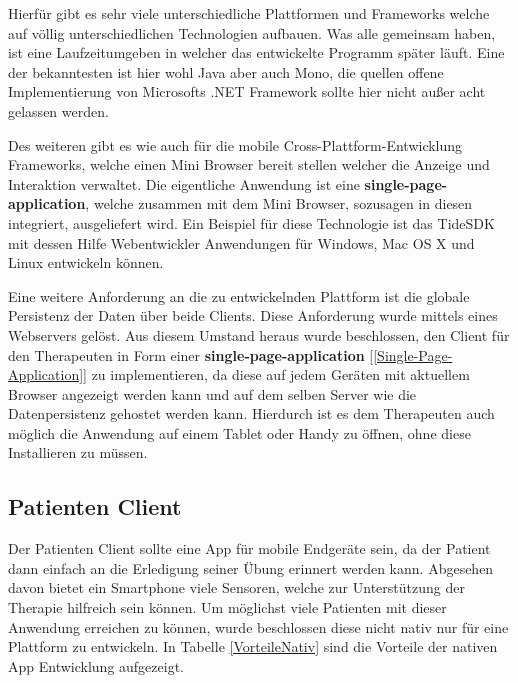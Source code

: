 Hierfür gibt es sehr viele unterschiedliche Plattformen und Frameworks welche auf völlig unterschiedlichen Technologien aufbauen. Was alle gemeinsam haben, ist eine Laufzeitumgeben in welcher das entwickelte Programm später läuft. Eine der bekanntesten ist hier wohl Java aber auch Mono, die quellen offene Implementierung von Microsofts .NET Framework sollte hier nicht außer acht gelassen werden. 

Des weiteren gibt es wie auch für die mobile Cross-Plattform-Entwicklung Frameworks, welche einen Mini Browser bereit stellen welcher die Anzeige und Interaktion verwaltet. Die eigentliche Anwendung ist eine \textbf{single-page-application}, welche zusammen mit dem Mini Browser, sozusagen in diesen integriert, ausgeliefert wird. Ein Beispiel für diese Technologie ist das TideSDK mit dessen Hilfe Webentwickler Anwendungen für Windows, Mac OS X und Linux entwickeln können.

Eine weitere Anforderung an die zu entwickelnden Plattform ist die globale Persistenz der Daten über beide Clients. Diese Anforderung wurde mittels eines Webservers gelöst. Aus diesem Umstand heraus wurde beschlossen, den Client für den Therapeuten in Form einer \textbf{single-page-application} [\ref{Single-Page-Application}] zu implementieren, da diese auf jedem Geräten mit aktuellem Browser angezeigt werden kann und auf dem selben Server wie die Datenpersistenz gehostet werden kann.
Hierdurch ist es dem Therapeuten auch möglich die Anwendung auf einem Tablet oder Handy zu öffnen, ohne diese Installieren zu müssen.

\subsection{Patienten Client}
Der Patienten Client sollte eine App für mobile Endgeräte sein, da der Patient dann einfach an die Erledigung  seiner Übung erinnert werden kann. Abgesehen davon bietet ein Smartphone viele Sensoren, welche zur Unterstützung der Therapie hilfreich sein können. Um möglichst viele Patienten mit dieser Anwendung erreichen zu können, wurde beschlossen diese nicht nativ nur für eine Plattform zu entwickeln. In Tabelle \ref{VorteileNativ} sind die Vorteile der nativen App Entwicklung aufgezeigt.

